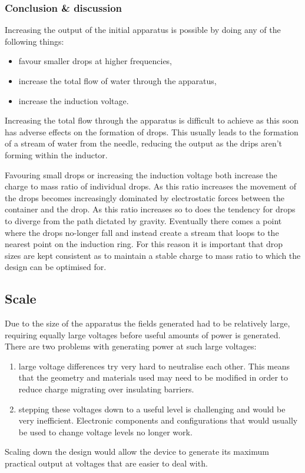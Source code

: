 \subsubsection*{Conclusion \& discussion}

Increasing the output of the initial apparatus is possible by doing
any of the following things:
\begin{itemize}
\item favour smaller drops at higher frequencies,
\item increase the total flow of water through the apparatus,
\item increase the induction voltage.
\end{itemize}
Increasing the total flow through the apparatus is difficult to achieve
as this soon has adverse effects on the formation of drops. This usually
leads to the formation of a stream of water from the needle, reducing
the output as the drips aren't forming within the inductor.

Favouring small drops or increasing the induction voltage both increase
the charge to mass ratio of individual drops. As this ratio increases
the movement of the drops becomes increasingly dominated by electrostatic
forces between the container and the drop. As this ratio increases
so to does the tendency for drops to diverge from the path dictated
by gravity. Eventually there comes a point where the drops no-longer
fall and instead create a stream that loops to the nearest point on
the induction ring. For this reason it is important that drop sizes
are kept consistent as to maintain a stable charge to mass ratio to
which the design can be optimised for.


\subsection*{Scale}

Due to the size of the apparatus the fields generated had to be relatively
large, requiring equally large voltages before useful amounts of power
is generated. There are two problems with generating power at such
large voltages:
\begin{enumerate}
\item large voltage differences try very hard to neutralise each other.
This means that the geometry and materials used may need to be modified
in order to reduce charge migrating over insulating barriers.
\item stepping these voltages down to a useful level is challenging and
would be very inefficient. Electronic components and configurations
that would usually be used to change voltage levels no longer work.
\end{enumerate}
Scaling down the design would allow the device to generate its maximum
practical output at voltages that are easier to deal with.


